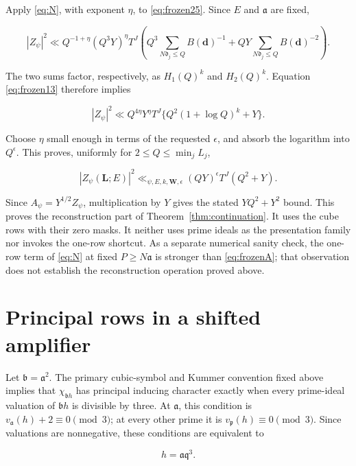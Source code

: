 \documentclass[11pt]{article}
\theoremstyle{remark}\newtheorem{remark}[theorem]{Remark}
\begin{document}
Apply \eqref{eq:N}, with exponent \(\eta\), to \eqref{eq:frozen25}. Since \(E\) and \(\mathfrak a\) are fixed,

\begin{equation}
|Z_\psi|^2
\ll Q^{-1+\eta}(Q^3Y)^\eta T^J
\left(Q^3\sum_{N\mathfrak d_j\le Q}B(\mathbf d)^{-1}
+QY\sum_{N\mathfrak d_j\le Q}B(\mathbf d)^{-2}\right).
\label{eq:frozen27}
\end{equation}

The two sums factor, respectively, as \(H_1(Q)^k\) and \(H_2(Q)^k\). Equation \eqref{eq:frozen13} therefore implies

\[
|Z_\psi|^2\ll Q^{4\eta}Y^\eta T^J
\{Q^2(1+\log Q)^k+Y\}.
\]

Choose \(\eta\) small enough in terms of the requested \(\epsilon\), and absorb the logarithm into \(Q^\epsilon\). This proves, uniformly for \(2\le Q\le\min_jL_j\),

\begin{equation}
|Z_\psi(\mathbf L;E)|^2
\ll_{\psi,E,k,\mathbf W,\epsilon}(QY)^\epsilon T^J(Q^2+Y).
\label{eq:frozenA}
\end{equation}

Since \(A_\psi=Y^{1/2}Z_\psi\), multiplication by \(Y\) gives the stated \(YQ^2+Y^2\) bound. This proves the reconstruction part of Theorem~\ref{thm:continuation}. It uses the cube rows with their zero masks. It neither uses prime ideals as the presentation family nor invokes the one-row shortcut. As a separate numerical sanity check, the one-row term of \eqref{eq:N} at fixed \(P\ge N\mathfrak a\) is stronger than \eqref{eq:frozenA}; that observation does not establish the reconstruction operation proved above.

\section{Principal rows in a shifted amplifier}\label{sec:principal}

Let \(\mathfrak b=\mathfrak a^2\). The primary cubic-symbol and Kummer convention fixed above implies that \(\chi_{\mathfrak b h}\) has principal inducing character exactly when every prime-ideal valuation of \(\mathfrak b h\) is divisible by three. At \(\mathfrak a\), this condition is \(v_{\mathfrak a}(h)+2\equiv0\pmod3\); at every other prime it is \(v_{\mathfrak p}(h)\equiv0\pmod3\). Since valuations are nonnegative, these conditions are equivalent to

\begin{equation}
h=\mathfrak a\mathfrak q^3.\label{eq:frozen31}
\end{equation}
\end{document}
